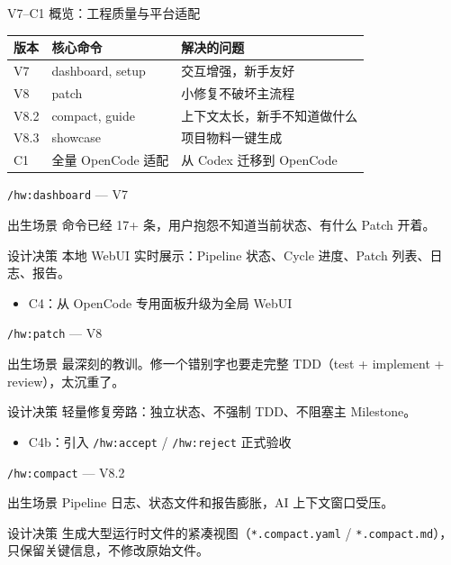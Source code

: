 \documentclass[theme=workflow,aspectratio=169,fontset=tech]{Hypo-Slide}
\begin{document}
\begin{frame}{V7--C1 概览：工程质量与平台适配}
  \centering
  \begin{tabular}{lll}
    \toprule
    版本 & 核心命令 & 解决的问题 \\
    \midrule
    V7   & dashboard, setup    & 交互增强，新手友好 \\
    V8   & patch               & 小修复不破坏主流程 \\
    V8.2 & compact, guide      & 上下文太长，新手不知道做什么 \\
    V8.3 & showcase            & 项目物料一键生成 \\
    C1   & 全量 OpenCode 适配  & 从 Codex 迁移到 OpenCode \\
    \bottomrule
  \end{tabular}
\end{frame}

\begin{frame}{\texttt{/hw:dashboard} — V7}
  \begin{block}{出生场景}
    命令已经 17+ 条，用户抱怨不知道当前状态、有什么 Patch 开着。
  \end{block}
  \begin{block}{设计决策}
    本地 WebUI 实时展示：Pipeline 状态、Cycle 进度、Patch 列表、日志、报告。
  \end{block}
  \begin{itemize}
    \item C4：从 OpenCode 专用面板升级为全局 WebUI
  \end{itemize}
\end{frame}

\begin{frame}{\texttt{/hw:patch} — V8}
  \begin{block}{出生场景}
    最深刻的教训。修一个错别字也要走完整 TDD（test + implement + review），太沉重了。
  \end{block}
  \begin{block}{设计决策}
    轻量修复旁路：独立状态、不强制 TDD、不阻塞主 Milestone。
  \end{block}
  \begin{itemize}
    \item C4b：引入 \texttt{/hw:accept} / \texttt{/hw:reject} 正式验收
  \end{itemize}
\end{frame}

\begin{frame}{\texttt{/hw:compact} — V8.2}
  \begin{block}{出生场景}
    Pipeline 日志、状态文件和报告膨胀，AI 上下文窗口受压。
  \end{block}
  \begin{block}{设计决策}
    生成大型运行时文件的紧凑视图（\texttt{*.compact.yaml} / \texttt{*.compact.md}），
    只保留关键信息，不修改原始文件。
  \end{block}
\end{frame}
\end{document}

